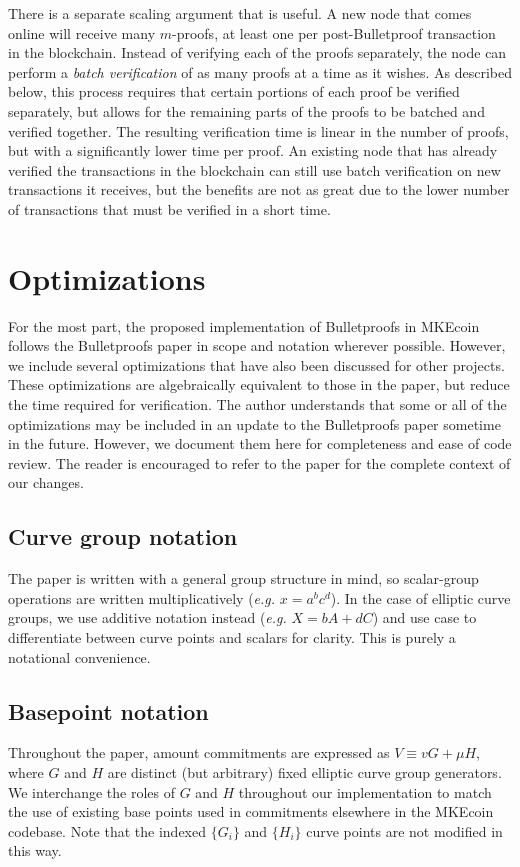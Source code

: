 \documentclass{mrl}
\begin{document}
There is a separate scaling argument that is useful. A new node that comes online will receive many $m$-proofs, at least one per post-Bulletproof transaction in the blockchain. Instead of verifying each of the proofs separately, the node can perform a \textit{batch verification} of as many proofs at a time as it wishes. As described below, this process requires that certain portions of each proof be verified separately, but allows for the remaining parts of the proofs to be batched and verified together. The resulting verification time is linear in the number of proofs, but with a significantly lower time per proof. An existing node that has already verified the transactions in the blockchain can still use batch verification on new transactions it receives, but the benefits are not as great due to the lower number of transactions that must be verified in a short time.

\section{Optimizations}
For the most part, the proposed implementation of Bulletproofs in MKEcoin follows the Bulletproofs paper in scope and notation wherever possible. However, we include several optimizations that have also been discussed for other projects. These optimizations are algebraically equivalent to those in the paper, but reduce the time required for verification. The author understands that some or all of the optimizations may be included in an update to the Bulletproofs paper sometime in the future. However, we document them here for completeness and ease of code review. The reader is encouraged to refer to the paper for the complete context of our changes.

\subsection{Curve group notation}
The paper is written with a general group structure in mind, so scalar-group operations are written multiplicatively (\textit{e.g.} $x = a^bc^d$). In the case of elliptic curve groups, we use additive notation instead (\textit{e.g.} $X = bA + dC$) and use case to differentiate between curve points and scalars for clarity. This is purely a notational convenience.

\subsection{Basepoint notation}
Throughout the paper, amount commitments are expressed as $V \equiv vG + \mu H$, where $G$ and $H$ are distinct (but arbitrary) fixed elliptic curve group generators. We interchange the roles of $G$ and $H$ throughout our implementation to match the use of existing base points used in commitments elsewhere in the MKEcoin codebase. Note that the indexed $\{G_i\}$ and $\{H_i\}$ curve points are not modified in this way.
\end{document}
